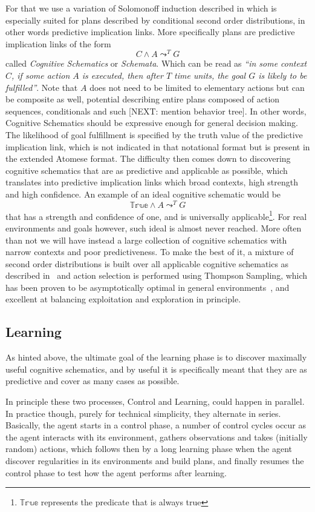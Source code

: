 \documentclass[runningheads]{llncs}
\newcommand{\lpreimp}[1]{\leadsto^{#1}}
\begin{document}
For that we use a variation of Solomonoff induction described in
\cite{Geisweiller2018} which is especially suited for plans described
by conditional second order distributions, in other words predictive
implication links.  More specifically plans are predictive implication
links of the form
$$C \land A \lpreimp{T} G$$
called \emph{Cognitive Schematics} or \emph{Schemata}.  Which can be
read as \emph{``in some context $C$, if some action $A$ is executed,
  then after $T$ time units, the goal $G$ is likely to be
  fulfilled''}.  Note that $A$ does not need to be limited to
elementary actions but can be composite as well, potential describing
entire plans composed of action sequences, conditionals and such
[NEXT: mention behavior tree].  In other words, Cognitive Schematics
should be expressive enough for general decision making.  The
likelihood of goal fulfillment is specified by the truth value of the
predictive implication link, which is not indicated in that notational
format but is present in the extended Atomese format.  The difficulty
then comes down to discovering cognitive schematics that are as
predictive and applicable as possible, which translates into
predictive implication links which broad contexts, high strength and
high confidence.  An example of an ideal cognitive schematic would be
$$\mathbb{True} \land A \lpreimp{T} G$$
that has a strength and confidence of one, and is universally
applicable\footnote{$\mathbb{True}$ represents the predicate that is
  always true}.  For real environments and goals however, such ideal
is almost never reached.  More often than not we will have instead a
large collection of cognitive schematics with narrow contexts and poor
predictiveness.  To make the best of it, a mixture of second order
distributions is built over all applicable cognitive schematics as
described in~\cite{Geisweiller2018} and action selection is performed
using Thompson Sampling, which has been proven to be asymptotically
optimal in general environments~\cite{Leike2016}, and excellent at
balancing exploitation and exploration in principle.

\subsection{Learning}
As hinted above, the ultimate goal of the learning phase is to
discover maximally useful cognitive schematics, and by useful it is
specifically meant that they are as predictive and cover as many cases
as possible.

In principle these two processes, Control and Learning, could happen
in parallel.  In practice though, purely for technical simplicity,
they alternate in series.  Basically, the agent starts in a control
phase, a number of control cycles occur as the agent interacts with
its environment, gathers observations and takes (initially random)
actions, which follows then by a long learning phase when the agent
discover regularities in its environments and build plans, and finally
resumes the control phase to test how the agent performs after
learning.
\end{document}
